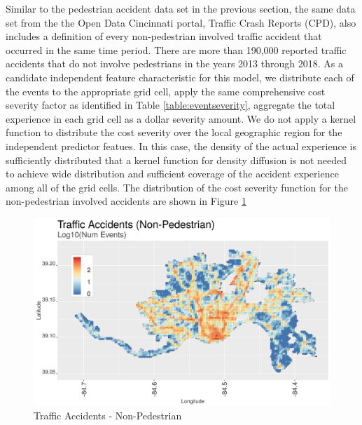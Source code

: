 \documentclass{llncs}
\begin{document}
Similar to the pedestrian accident data set in the previous section, the same data set from the the Open Data Cincinnati portal, Traffic Crash Reports (CPD), also includes a definition of every non-pedestrian involved traffic accident that occurred in the same time period.  There are more than 190,000 reported traffic accidents that do not involve pedestrians in the years 2013 through 2018. As a candidate independent feature characteristic for this model, we distribute each of the events to the appropriate grid cell, apply the same comprehensive cost severity factor as identified in Table \ref{table:eventseverity}, aggregate the total experience in each grid cell as a dollar severity amount. We do not apply a kernel function to distribute the cost severity over the local geographic region for the independent predictor featues. In this case, the density of the actual experience is sufficiently distributed that a kernel function for density diffusion is not needed to achieve wide distribution and sufficient coverage of the accident experience among all of the grid cells. The distribution of the cost severity function for the non-pedestrian involved accidents are shown in Figure \ref{figure:trafficAccidentsNonPedestrian}

\FloatBarrier
\begin{figure}
 	\includegraphics[width=\textwidth, height=\textheight, keepaspectratio]{trafficAccidentsNonPedestrian.png}
 	\caption{Traffic Accidents - Non-Pedestrian}
	\label{figure:trafficAccidentsNonPedestrian}
\end{figure}
\FloatBarrier

\end{document}
